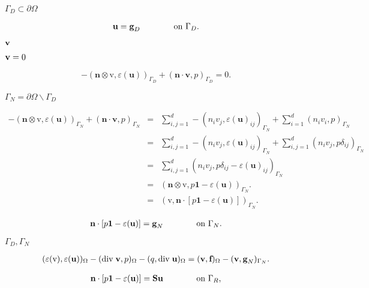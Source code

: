 \documentclass{article}
\begin{document}
$\Gamma_D\subset\partial\Omega$
\pagebreak

\begin{eqnarray*} \textbf u = \textbf g_D \qquad\qquad \textrm{on}\ \Gamma_D. \end{eqnarray*}
\pagebreak

$\textbf v$
\pagebreak

$\textbf v=0$
\pagebreak

\begin{eqnarray*} -(\textbf{n} \otimes \mathrm v,\varepsilon(\textbf{u}))_{\Gamma_D} + (\textbf{n}\cdot\textbf{v}, p)_{\Gamma_D} = 0. \end{eqnarray*}
\pagebreak

$\Gamma_N=\partial\Omega\backslash\Gamma_D$
\pagebreak

\begin{eqnarray*} -(\textbf{n} \otimes \mathrm v,\varepsilon(\textbf{u}))_{\Gamma_N} + (\textbf{n}\cdot\textbf{v}, p)_{\Gamma_N} &=& \sum_{i,j=1}^d -(n_i v_j,\varepsilon(\textbf{u})_{ij})_{\Gamma_N} + \sum_{i=1}^d (n_i v_i, p)_{\Gamma_N} \\ &=& \sum_{i,j=1}^d -(n_i v_j,\varepsilon(\textbf{u})_{ij})_{\Gamma_N} + \sum_{i,j=1}^d (n_i v_j, p \delta_{ij})_{\Gamma_N} \\ &=& \sum_{i,j=1}^d (n_i v_j,p \delta_{ij} - \varepsilon(\textbf{u})_{ij})_{\Gamma_N} \\ &=& (\textbf{n} \otimes \mathrm v, p \textbf{1} - \varepsilon(\textbf{u}))_{\Gamma_N}. \\ &=& (\mathrm v, \textbf{n}\cdot [p \textbf{1} - \varepsilon(\textbf{u})])_{\Gamma_N}. \end{eqnarray*}
\pagebreak

\begin{eqnarray*} \textbf{n}\cdot [p \textbf{1} - \varepsilon(\textbf{u})] = \textbf g_N \qquad\qquad \textrm{on}\ \Gamma_N. \end{eqnarray*}
\pagebreak

$\Gamma_D,\Gamma_N$
\pagebreak

\begin{eqnarray*} (\varepsilon(\mathrm v),\varepsilon(\textbf{u}))_{\Omega} - (\textrm{div}\; \textbf{v}, p)_{\Omega} - (q,\textrm{div}\; \textbf{u})_{\Omega} = (\textbf{v}, \textbf{f})_\Omega - (\textbf{v}, \textbf g_N)_{\Gamma_N}. \end{eqnarray*}
\pagebreak

\begin{eqnarray*} \textbf{n}\cdot [p \textbf{1} - \varepsilon(\textbf{u})] = \textbf S \textbf u \qquad\qquad \textrm{on}\ \Gamma_R, \end{eqnarray*}
\pagebreak
\end{document}
